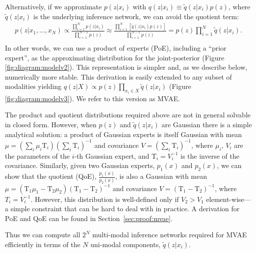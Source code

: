 Alternatively, if we approximate $p(z|x_i)$ with $q(z|x_i) \equiv \tilde{q}(z|x_i)p(z)$, where $\tilde{q}(z|x_i)$ is the underlying inference network, we can avoid the quotient term:
\begin{equation}
\begin{aligned}
p(z|x_1, ..., x_N)
\propto \frac{\prod_{i=1}^{N}p(z|x_i)}{\prod_{i=1}^{N-1}p(z)}
\approx \frac{\prod_{i=1}^{N}[\tilde{q}(z|x_i)p(z)]}{\prod_{i=1}^{N-1}p(z)}
= p(z)\prod_{i=1}^{N}\tilde{q}(z|x_i). \\
\end{aligned}
\label{eqn:derive:simple}
\end{equation}
In other words, we can use a product of experts (PoE), including a ``prior expert'', as the approximating distribution for the joint-posterior (Figure \ref{fig:diagram:modelv2}).
This representation is simpler and, as we describe below, numerically more stable.
This derivation is easily extended to any subset of modalities yielding $q(z|X) \propto p(z)\prod_{x_{i} \in X} \tilde{q}(z|x_{i})$ (Figure \ref{fig:diagram:modelv3}). We refer to this version as MVAE.

The product and quotient distributions required above are not in general solvable in closed form.
However, when $p(z)$ and $\tilde{q}(z|x_i)$ are Gaussian there is a simple analytical solution: a product of Gaussian experts is itself Gaussian \cite{cao2014generalized} with mean $\mu = (\sum_{i} \mu_{i}\text{T}_{i})(\sum_{i}\text{T}_{i})^{-1}$ and covariance $V = (\sum_{i} \text{T}_{i})^{-1}$, where $\mu_{i}$, $V_{i}$ are the parameters of the $i$-th Gaussian expert, and $\text{T}_{i} = V_{i}^{-1}$ is the inverse of the covariance.
Similarly, given two Gaussian experts, $p_1(x)$ and $p_2(x)$, we can show that the quotient (QoE), $\frac{p_1(x)}{p_2(x)}$, is also a Gaussian with mean $\mu = (\text{T}_{1}\mu_{1} - \text{T}_{2}\mu_{2})(\text{T}_1 - \text{T}_2)^{-1}$ and covariance $V = (\text{T}_1 - \text{T}_2)^{-1}$, where $T_i = V_{i}^{-1}$.
However, this distribution is well-defined only if $V_{2} > V_{1}$ element-wise---a simple constraint that can be hard to deal with in practice. A derivation for PoE and QoE can be found in Section~\ref{sec:proof:mvae}.

Thus we can compute all $2^N$ multi-modal inference networks required for MVAE efficiently in terms of the $N$ uni-modal components, $\tilde{q}(z|x_{i})$.


